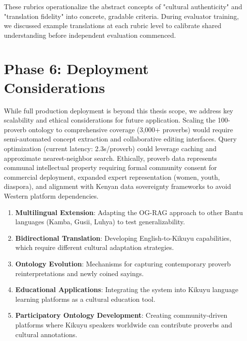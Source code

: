 These rubrics operationalize the abstract concepts of "cultural authenticity" and "translation fidelity" into concrete, gradable criteria. During evaluator training, we discussed example translations at each rubric level to calibrate shared understanding before independent evaluation commenced.

\section{Phase 6: Deployment Considerations}
\label{sec:phase_deployment}

While full production deployment is beyond this thesis scope, we address key scalability and ethical considerations for future application. Scaling the 100-proverb ontology to comprehensive coverage (3,000+ proverbs) would require semi-automated concept extraction and collaborative editing interfaces. Query optimization (current latency: 2.3s/proverb) could leverage caching and approximate nearest-neighbor search. Ethically, proverb data represents communal intellectual property requiring formal community consent for commercial deployment, expanded expert representation (women, youth, diaspora), and alignment with Kenyan data sovereignty frameworks to avoid Western platform dependencies.

\begin{enumerate}
    \item \textbf{Multilingual Extension}: Adapting the OG-RAG approach to other Bantu languages (Kamba, Gusii, Luhya) to test generalizability.
    
    \item \textbf{Bidirectional Translation}: Developing English-to-Kikuyu capabilities, which require different cultural adaptation strategies.
    
    \item \textbf{Ontology Evolution}: Mechanisms for capturing contemporary proverb reinterpretations and newly coined sayings.
    
    \item \textbf{Educational Applications}: Integrating the system into Kikuyu language learning platforms as a cultural education tool.
    
    \item \textbf{Participatory Ontology Development}: Creating community-driven platforms where Kikuyu speakers worldwide can contribute proverbs and cultural annotations.
\end{enumerate}


